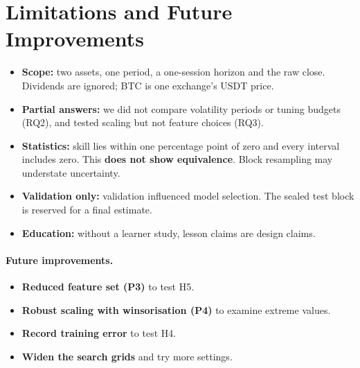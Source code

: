 \section{Limitations and Future Improvements}
\label{sec:limitations}

\begin{itemize}
  \item \textbf{Scope:} two assets, one period, a one-session horizon and the raw
  close. Dividends are ignored; BTC is one exchange's USDT price.
  \item \textbf{Partial answers:} we did not compare volatility periods or tuning
  budgets (RQ2), and tested scaling but not feature choices (RQ3).
  \item \textbf{Statistics:} skill lies within one percentage point of zero and
  every interval includes zero. This \textbf{does not show equivalence}. Block
  resampling may understate uncertainty.
  \item \textbf{Validation only:} validation influenced model selection. The sealed
  test block is reserved for a final estimate.
  \item \textbf{Education:} without a learner study, lesson claims are design
  claims.
\end{itemize}

\paragraph{Future improvements.}
\begin{itemize}
  \item \textbf{Reduced feature set (P3)} to test H5.
  \item \textbf{Robust scaling with winsorisation (P4)} to examine extreme values.
  \item \textbf{Record training error} to test H4.
  \item \textbf{Widen the search grids} and try more settings.
\end{itemize}
